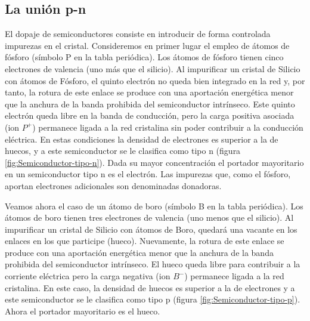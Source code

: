 \subsection{La unión p-n}

El dopaje de semiconductores consiste en introducir de forma controlada
impurezas en el cristal. Consideremos en primer lugar el empleo de
átomos de fósforo (símbolo P en la tabla periódica). Los átomos de
fósforo tienen cinco electrones de valencia (uno más que el silicio).
Al impurificar un cristal de Silicio con átomos de Fósforo, el quinto
electrón no queda bien integrado en la red y, por tanto, la rotura
de este enlace se produce con una aportación energética menor que
la anchura de la banda prohibida del semiconductor intrínseco. Este
quinto electrón queda libre en la banda de conducción, pero la carga
positiva asociada (ion $P^{+}$) permanece ligada a la red cristalina
sin poder contribuir a la conducción eléctrica. En estas condiciones
la densidad de electrones es superior a la de huecos, y a este semiconductor
se le clasifica como tipo n (figura \ref{fig:Semiconductor-tipo-n}).
Dada su mayor concentración el portador mayoritario en un semiconductor
tipo n es el electrón. Las impurezas que, como el fósforo, aportan
electrones adicionales son denominadas donadoras.

Veamos ahora el caso de un átomo de boro (símbolo B en la tabla periódica).
Los átomos de boro tienen tres electrones de valencia (uno menos que
el silicio). Al impurificar un cristal de Silicio con átomos de Boro,
quedará una vacante en los enlaces en los que participe (hueco). Nuevamente,
la rotura de este enlace se produce con una aportación energética
menor que la anchura de la banda prohibida del semiconductor intrínseco.
El hueco queda libre para contribuir a la corriente eléctrica pero
la carga negativa (ion $B^{-}$) permanece ligada a la red cristalina.
En este caso, la densidad de huecos es superior a la de electrones
y a este semiconductor se le clasifica como tipo p (figura \ref{fig:Semiconductor-tipo-p}).
Ahora el portador mayoritario es el hueco.

